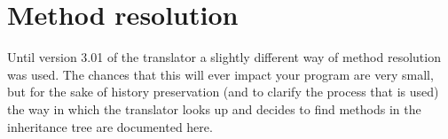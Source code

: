 \section{Method resolution}
Until version 3.01 of the \nr{} translator a slightly different way of
method resolution was used. The chances that this will ever impact your program are
very small, but for the sake of history preservation (and to clarify
the process that is used) the way in which the translator looks up and
decides to find methods in the inheritance tree are documented here.



